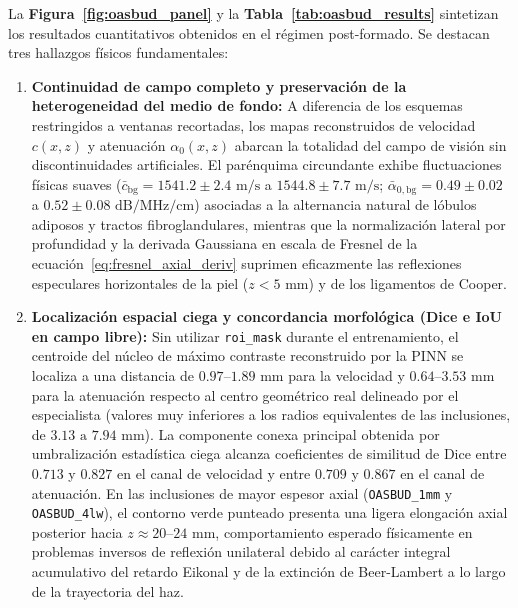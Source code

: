 \documentclass[9pt]{article}
\begin{document}
La \textbf{Figura~\ref{fig:oasbud_panel}} y la \textbf{Tabla~\ref{tab:oasbud_results}} sintetizan los resultados cuantitativos obtenidos en el régimen post-formado. Se destacan tres hallazgos físicos fundamentales:
\begin{enumerate}
    \item \textbf{Continuidad de campo completo y preservación de la heterogeneidad del medio de fondo:} A diferencia de los esquemas restringidos a ventanas recortadas, los mapas reconstruidos de velocidad $c(x,z)$ y atenuación $\alpha_0(x,z)$ abarcan la totalidad del campo de visión sin discontinuidades artificiales. El parénquima circundante exhibe fluctuaciones físicas suaves ($\bar{c}_{\text{bg}} = 1541.2 \pm 2.4\text{ m/s}$ a $1544.8 \pm 7.7\text{ m/s}$; $\bar{\alpha}_{0,\text{bg}} = 0.49 \pm 0.02$ a $0.52 \pm 0.08\text{ dB/MHz/cm}$) asociadas a la alternancia natural de lóbulos adiposos y tractos fibroglandulares, mientras que la normalización lateral por profundidad y la derivada Gaussiana en escala de Fresnel de la ecuación~\eqref{eq:fresnel_axial_deriv} suprimen eficazmente las reflexiones especulares horizontales de la piel ($z < 5\text{ mm}$) y de los ligamentos de Cooper.
    \item \textbf{Localización espacial ciega y concordancia morfológica (Dice e IoU en campo libre):} Sin utilizar \texttt{roi\_mask} durante el entrenamiento, el centroide del núcleo de máximo contraste reconstruido por la PINN se localiza a una distancia de $0.97\text{--}1.89\text{ mm}$ para la velocidad y $0.64\text{--}3.53\text{ mm}$ para la atenuación respecto al centro geométrico real delineado por el especialista (valores muy inferiores a los radios equivalentes de las inclusiones, de $3.13\text{ a }7.94\text{ mm}$). La componente conexa principal obtenida por umbralización estadística ciega alcanza coeficientes de similitud de Dice entre $0.713$ y $0.827$ en el canal de velocidad y entre $0.709$ y $0.867$ en el canal de atenuación. En las inclusiones de mayor espesor axial (\texttt{OASBUD\_1mm} y \texttt{OASBUD\_4lw}), el contorno verde punteado presenta una ligera elongación axial posterior hacia $z \approx 20\text{--}24\text{ mm}$, comportamiento esperado físicamente en problemas inversos de reflexión unilateral debido al carácter integral acumulativo del retardo Eikonal y de la extinción de Beer-Lambert a lo largo de la trayectoria del haz.

\end{enumerate}
\end{document}
